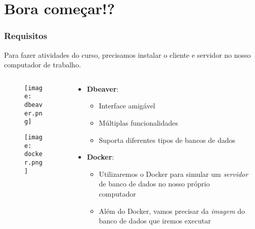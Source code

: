 \documentclass[t, 10pt, aspectratio=169, table, x11names]{beamer}
\begin{document}
	\section{Bora começar!?}

	\begin{frame}
		\frametitle{Requisitos}
		Para fazer atividades do curso, precisamos instalar o cliente e servidor no nosso computador de trabalho.
		\begin{columns}[t]
			\begin{column}{0.20\textwidth}
				\vspace{0.3cm}
				\begin{figure}[h]
					\texttt{[image: dbeaver.png]}
				\end{figure}
				\vspace{1.1cm}
				\begin{figure}[h]
					\texttt{[image: docker.png]}
				\end{figure}
			\end{column}

			\begin{column}{0.70\textwidth}
				\begin{itemize}
					\item \textbf{Dbeaver}: \href{https://dbeaver.io/download}{ }
					\begin{itemize}
						\item Interface amigável
						\item Múltiplas funcionalidades
						\item Suporta diferentes tipos de bancos de dados
					\end{itemize}

					\vspace{0.4cm}
					\item \textbf{Docker}: \href{https://www.docker.com/products/docker-desktop/}{}
					
					\begin{itemize}
						\item Utilizaremos o Docker para simular um \textit{servidor} de banco de dados no nosso próprio computador
						\item Além do Docker, vamos precisar da \textit{imagem} do banco de dados que iremos executar
					\end{itemize}
				\end{itemize}
			\end{column}
			\begin{column}{0.05\textwidth}
			\end{column}
		\end{columns}
	\end{frame}
\end{document}
